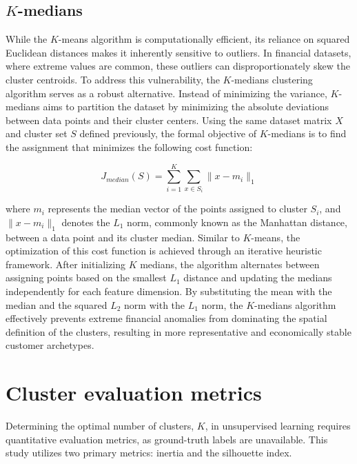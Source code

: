         \subsection{$K$-medians}
        \label{subsec:kmedians}
        While the $K$-means algorithm is computationally efficient, its reliance on squared Euclidean distances makes it inherently sensitive to outliers.
        In financial datasets, where extreme values are common, these outliers can disproportionately skew the cluster centroids.
        To address this vulnerability, the $K$-medians clustering algorithm serves as a robust alternative.
        Instead of minimizing the variance, $K$-medians aims to partition the dataset by minimizing the absolute deviations between data points and their cluster centers.
        Using the same dataset matrix $X$ and cluster set $S$ defined previously, the formal objective of $K$-medians is to find the assignment that minimizes the following cost function:
        
        \begin{equation}
        \label{eq:kmedianscost}
            J_{median}(S) = \sum_{i=1}^{K} \sum_{x \in S_i} \|x - m_i\|_1
        \end{equation}
        
        where $m_i$ represents the median vector of the points assigned to cluster $S_i$, and $\|x - m_i\|_1$ denotes the $L_1$ norm, commonly known as the Manhattan distance, between a data point and its cluster median.
        Similar to $K$-means, the optimization of this cost function is achieved through an iterative heuristic framework.
        After initializing $K$ medians, the algorithm alternates between assigning points based on the smallest $L_1$ distance and updating the medians independently for each feature dimension.
        By substituting the mean with the median and the squared $L_2$ norm with the $L_1$ norm, the $K$-medians algorithm effectively prevents extreme financial anomalies from dominating the spatial definition of the clusters, resulting in more representative and economically stable customer archetypes.
        
    \section{Cluster evaluation metrics}
    \label{sec:evaluation_metrics}
    Determining the optimal number of clusters, $K$, in unsupervised learning requires quantitative evaluation metrics, as ground-truth labels are unavailable.
    This study utilizes two primary metrics: inertia and the silhouette index.
    
